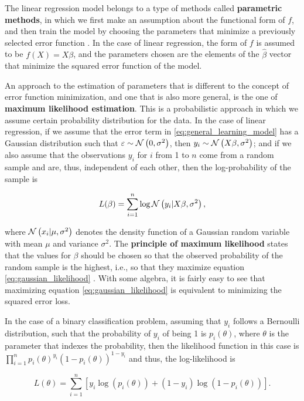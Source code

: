 The linear regression model belongs to a type of methods called \textbf{parametric methods}, in which we first make an assumption about the functional form of $f$, and then train the model by choosing the parameters that minimize a previously selected error function \cite[p.~21]{james2013introduction}. In the case of linear regression, the form of $f$ is assumed to be $f(X) = X\beta$, and the parameters chosen are the elements of the $\hat{\beta}$ vector that minimize the squared error function of the model.

An approach to the estimation of parameters that is different to the concept of error function minimization, and one that is also more general, is the one of \textbf{maximum likelihood estimation}.
This is a probabilistic approach in which we assume certain probability distribution for the data.
In the case of linear regression, if we assume that the error term in \ref{eq:general_learning_model} has a Gaussian distribution such that $\varepsilon \sim \mathcal{N}\left( 0, \sigma^2 \right)$, then $y_i \sim \mathcal{N}\left( X \beta, \sigma^2 \right)$; and if we also assume that the observations $y_i$ for $i$ from 1 to $n$ come from a random sample and are, thus, independent of each other, then the log-probability of the sample is

\begin{equation}
  \label{eq:gaussian_likelihood}
  L(\beta) = \sum_{i = 1}^n \log \mathcal{N}\left( y_i | X \beta, \sigma^2 \right),
\end{equation}

where $\mathcal{N}\left( x_i | \mu, \sigma^2 \right)$ denotes the density function of a Gaussian random variable with mean $\mu$ and variance $\sigma^2$. The \textbf{principle of maximum likelihood} states that the values for $\beta$ should be chosen so that the observed probability of the random sample is the highest, i.e., so that they maximize equation \ref{eq:gaussian_likelihood} \cite[p.~31]{friedman2001elements}.
With some algebra, it is fairly easy to see that maximizing equation \ref{eq:gaussian_likelihood} is equivalent to minimizing the squared error loss.

In the case of a binary classification problem, assuming that $y_i$ follows a Bernoulli distribution, such that the probability of $y_i$ of being 1 is $p_i(\theta)$, where $\theta$ is the parameter that indexes the probability, then the likelihood function in this case is $\prod_{i = 1}^n  p_i(\theta)^{y_i}\left(1 - p_i(\theta) \right)^{1 - y_i}$ and thus, the log-likelihood is

$$
  L(\theta) = \sum_{i = 1}^n \left[ y_i \log\left( p_i(\theta) \right) + (1 - y_i) \log \left( 1 - p_i(\theta) \right) \right].
$$

